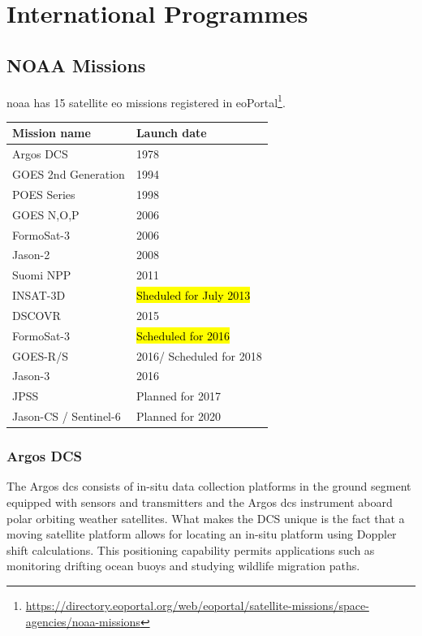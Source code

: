 \documentclass{article}
\makeatletter
\renewenvironment{table}
     {\@float{table} \small}
     {\end@float}
\makeatother
\begin{document}
\section{International Programmes}
\label{sec:intprog}


\subsection{NOAA Missions}
\label{ssec:noaa_missions}
\ac{noaa} has 15 satellite \ac{eo} missions registered in eoPortal\footnote{\url{https://directory.eoportal.org/web/eoportal/satellite-missions/space-agencies/noaa-missions}}.

\begin{table}
\center
\caption{\ac{noaa} missions}
\label{tb:noaa_missioons}
\begin{tabularx}{0.5\textwidth}{L{0.5}L{0.5}}
\toprule
Mission name & Launch date \\
\midrule
Argos DCS & 1978 \\
GOES 2nd Generation & 1994  \\
POES Series & 1998 \\
GOES N,O,P & 2006 \\
FormoSat-3 & 2006\\
Jason-2 & 2008 \\
Suomi NPP & 2011 \\
INSAT-3D & \hl{Sheduled for July 2013} \\
DSCOVR & 2015 \\
FormoSat-3 & \hl{Scheduled for 2016}\\
GOES-R/S & 2016/ Scheduled for 2018 \\
Jason-3 & 2016 \\
JPSS & Planned for 2017 \\
Jason-CS / Sentinel-6 & Planned for 2020\\
\bottomrule
\end{tabularx}
\end{table}



\subsubsection{Argos DCS}
\label{sssec:argos}

The Argos \ac{dcs} consists of in-situ data collection platforms in the ground segment equipped with sensors and transmitters and the Argos \ac{dcs} instrument aboard polar orbiting weather satellites. 
What makes the DCS unique is the fact that a moving satellite platform allows for locating an in-situ platform using Doppler shift calculations. This positioning capability permits applications such as monitoring drifting ocean buoys and studying wildlife migration paths.
\end{document}
